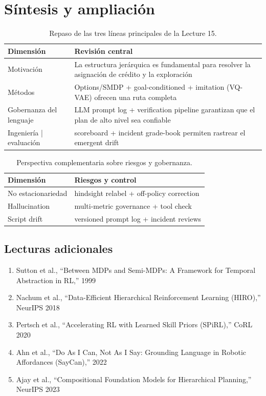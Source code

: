 \documentclass[a4paper]{article}
\begin{document}
\section{Síntesis y ampliación}

\begin{table}[H]
\centering
\begin{tabular}{p{3.5cm}p{8cm}}
\toprule
Dimensión & Revisión central \\
\midrule
Motivación & La estructura jerárquica es fundamental para resolver la asignación de crédito y la exploración \\
Métodos & Options/SMDP + goal-conditioned + imitation (VQ-VAE) ofrecen una ruta completa \\
Gobernanza del lenguaje & LLM prompt log + verification pipeline garantizan que el plan de alto nivel sea confiable \\
Ingeniería | evaluación & scoreboard + incident grade-book permiten rastrear el emergent drift \\
\bottomrule
\end{tabular}
\caption{Repaso de las tres líneas principales de la Lecture 15.}
\end{table}

\begin{table}[H]
\centering
\begin{tabular}{p{3.5cm}p{8cm}}
\toprule
Dimensión & Riesgos y control \\
\midrule
No estacionariedad & hindsight relabel + off-policy correction \\
Hallucination & multi-metric governance + tool check \\
Script drift & versioned prompt log + incident reviews \\
\bottomrule
\end{tabular}
\caption{Perspectiva complementaria sobre riesgos y gobernanza.}
\end{table}

\subsection{Lecturas adicionales}
\begin{enumerate}
    \item Sutton et al., ``Between MDPs and Semi-MDPs: A Framework for Temporal Abstraction in RL,'' 1999
    \item Nachum et al., ``Data-Efficient Hierarchical Reinforcement Learning (HIRO),'' NeurIPS 2018
    \item Pertsch et al., ``Accelerating RL with Learned Skill Priors (SPiRL),'' CoRL 2020
    \item Ahn et al., ``Do As I Can, Not As I Say: Grounding Language in Robotic Affordances (SayCan),'' 2022
    \item Ajay et al., ``Compositional Foundation Models for Hierarchical Planning,'' NeurIPS 2023
\end{enumerate}
\end{document}

